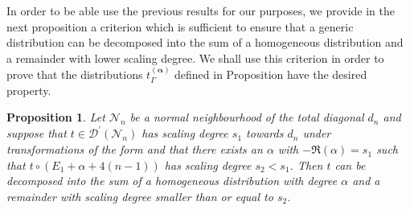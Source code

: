 \documentclass[10pt]{book}
\newcommand{\Dcal}{\mathcal{D}}
\newcommand{\Ncal}{\mathcal{N}}
\theoremstyle{break}
\newtheorem{proposition}{Proposition}
\begin{document}
In order to be able use the previous results for our purposes, we provide in the next proposition a criterion which is sufficient to ensure that a generic distribution can be decomposed into the sum of a homogeneous distribution and a remainder with lower scaling degree. We shall use this criterion in order to prove that the distributions $t_\Gamma^{(\boldsymbol{\alpha})}$ defined in Proposition%
have the desired property.

\begin{proposition}
Let $\Ncal_n$ be a normal neighbourhood of the total diagonal $d_n$ and suppose that $t\in \Dcal^\prime(\Ncal_n)$ has scaling degree $s_1$ towards $d_n$ under transformations of the form %
and that there exists an $\alpha$ with $-\Re(\alpha)=s_1$ such that $t\circ(E_1+\alpha+4(n-1))$ has scaling degree $s_2 < s_1$. Then $t$ can be decomposed into the sum of a homogeneous distribution with degree $\alpha$ and a remainder with scaling degree smaller than or equal to $s_2$.
\end{proposition}
\end{document}
